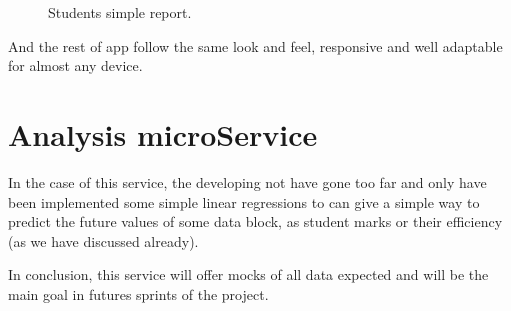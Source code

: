 \begin{figure}[H]
\begin{minipage}{.5\textwidth}
  \caption{Students simple report.}
\end{minipage}
\end{figure}

\noindent And the rest of app follow the same look and feel, responsive and well adaptable
for almost any device.

\section{Analysis microService}

In the case of this service, the developing not have gone too far and only have
been implemented some simple linear regressions to can give a simple way to
predict the future values of some data block, as student marks or their efficiency
(as we have discussed already).

In conclusion, this service will offer mocks of all data expected and will be
the main goal in futures sprints of the project.
